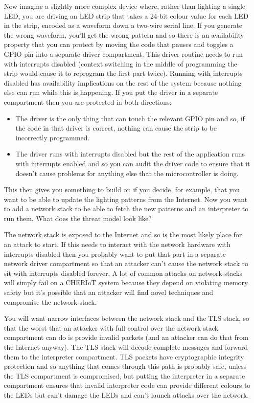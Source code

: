 Now imagine a slightly more complex device where, rather than lighting a single LED, you are driving an LED strip that takes a 24-bit colour value for each LED in the strip, encoded as a waveform down a two-wire serial line.
If you generate the wrong waveform, you'll get the wrong pattern and so there is an availability property that you can protect by moving the code that pauses and toggles a GPIO pin into a separate driver compartment.
This driver routine needs to run with interrupts disabled (context switching in the middle of programming the strip would cause it to reprogram the first part twice).
Running with interrupts disabled has availability implications on the rest of the system because nothing else can run while this is happening.
If you put the driver in a separate compartment then you are protected in both directions:

\begin{itemize}
	\item{The driver is the only thing that can touch the relevant GPIO pin and so, if the code in that driver is correct, nothing can cause the strip to be incorrectly programmed.}
	\item{The driver runs with interrupts disabled but the rest of the application runs with interrupts enabled and so you can audit the driver code to ensure that it doesn't cause problems for anything else that the microcontroller is doing.}
\end{itemize}

This then gives you something to build on if you decide, for example, that you want to be able to update the lighting patterns from the Internet.
Now you want to add a network stack to be able to fetch the new patterns and an interpreter to run them.
What does the threat model look like?

The network stack is exposed to the Internet and so is the most likely place for an attack to start.
If this needs to interact with the network hardware with interrupts disabled then you probably want to put that part in a separate network driver compartment so that an attacker can't cause the network stack to sit with interrupts disabled forever.
A lot of common attacks on network stacks will simply fail on a CHERIoT system because they depend on violating memory safety but it's possible that an attacker will find novel techniques and compromise the network stack.

You will want narrow interfaces between the network stack and the TLS stack, so that the worst that an attacker with full control over the network stack compartment can do is provide invalid packets (and an attacker can do that from the Internet anyway).
The TLS stack will decode complete messages and forward them to the interpreter compartment.
TLS packets have cryptographic integrity protection and so anything that comes through this path is probably safe, unless the TLS compartment is compromised, but putting the interpreter in a separate compartment ensures that invalid interpreter code can provide different colours to the LEDs but can't damage the LEDs and can't launch attacks over the network.

